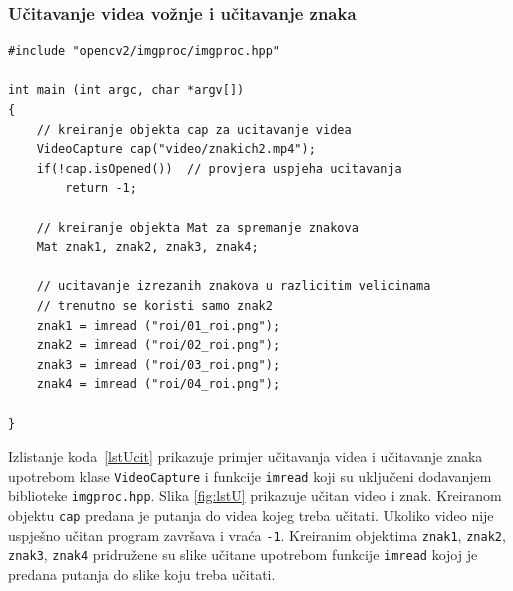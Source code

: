\newpage
\subsubsection{Učitavanje videa vožnje i učitavanje znaka} %
\label{ssub:Učitavanje videa vožnje i učitavanje znaka}


\begin{lstlisting}[label=lstUcit,caption={Izvorni kod za učitavanje
videa i znaka}]
#include "opencv2/imgproc/imgproc.hpp"

int main (int argc, char *argv[])
{
    // kreiranje objekta cap za ucitavanje videa
    VideoCapture cap("video/znakich2.mp4");
    if(!cap.isOpened())  // provjera uspjeha ucitavanja
        return -1;

    // kreiranje objekta Mat za spremanje znakova
    Mat znak1, znak2, znak3, znak4;

    // ucitavanje izrezanih znakova u razlicitim velicinama
    // trenutno se koristi samo znak2 
    znak1 = imread ("roi/01_roi.png");      
    znak2 = imread ("roi/02_roi.png");
    znak3 = imread ("roi/03_roi.png");
    znak4 = imread ("roi/04_roi.png");

}
\end{lstlisting}

Izlistanje koda~\ref{lstUcit} prikazuje primjer učitavanja videa i
učitavanje znaka upotrebom klase \texttt{VideoCapture} i funkcije
\texttt{imread} koji su uključeni dodavanjem biblioteke
\texttt{imgproc.hpp}. 
Slika \ref{fig:lstU} prikazuje učitan video i znak. 
Kreiranom objektu \texttt{cap} predana je putanja
do videa kojeg treba učitati. Ukoliko video nije uspješno učitan program
završava i vraća \texttt{-1}. Kreiranim objektima \texttt{znak1},
\texttt{znak2}, \texttt{znak3}, \texttt{znak4} pridružene su slike
učitane upotrebom funkcije \texttt{imread} kojoj je predana putanja do
slike koju treba učitati.

